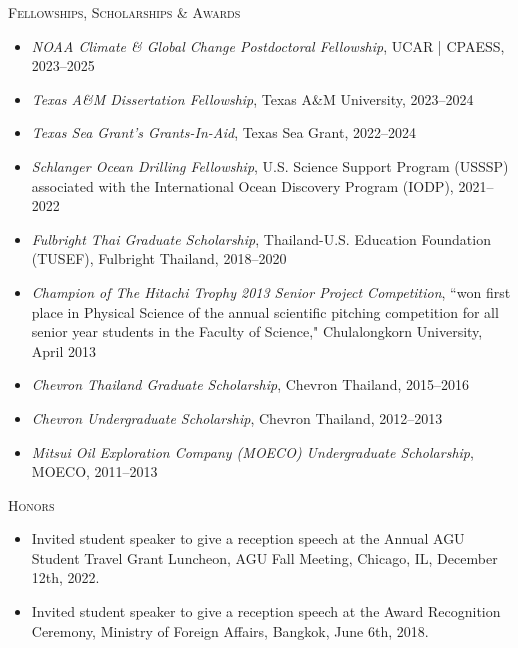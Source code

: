 \documentclass[11pt, letter]{article}
\newcommand{\margintext}[1]{\marginnote{\normalsize\textbf #1 |}}
\begin{document}
\margintext{Awards}
\textsc{Fellowships, Scholarships \& Awards}
\begin{itemize}[leftmargin=*]
    \item[] \emph{NOAA Climate \& Global Change Postdoctoral Fellowship}, UCAR | CPAESS, 2023–2025
    \item[] \emph{Texas A\&M Dissertation Fellowship}, Texas A\&M University, 2023–2024
    \item[] \emph{Texas Sea Grant's Grants-In-Aid}, Texas Sea Grant, 2022–2024
    \item[] \emph{Schlanger Ocean Drilling Fellowship}, U.S. Science Support Program (USSSP) associated with the International Ocean Discovery Program (IODP), 2021–2022
    \item[] \emph{Fulbright Thai Graduate Scholarship}, Thailand-U.S. Education Foundation (TUSEF), Fulbright Thailand, 2018–2020
    \item[] \emph{Champion of The Hitachi Trophy 2013 Senior Project Competition}, ``won first place in Physical Science of the annual scientific pitching competition for all senior year students in the Faculty of Science," Chulalongkorn University, April 2013
    \item[] \emph{Chevron Thailand Graduate Scholarship}, Chevron Thailand, 2015–2016
    \item[] \emph{Chevron Undergraduate Scholarship}, Chevron Thailand, 2012–2013
    \item[] \emph{Mitsui Oil Exploration Company (MOECO) Undergraduate Scholarship}, MOECO, 2011–2013 

\end{itemize}

\bigskip
\textsc{Honors}
\begin{itemize}[leftmargin=*]
    \item[] Invited student speaker to give a reception speech at the Annual AGU Student Travel Grant Luncheon, AGU Fall Meeting, Chicago, IL, December 12th, 2022.
    \item[] Invited student speaker to give a reception speech at the Award Recognition Ceremony, Ministry of Foreign Affairs, Bangkok, June 6th, 2018.
    

\end{itemize}
\end{document}
